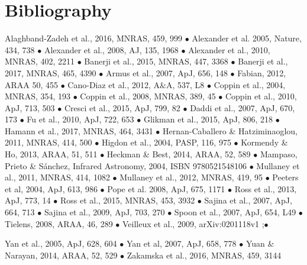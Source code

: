 \footnotesize
\section*{Bibliography}
\vspace{-8pt}
Alaghband-Zadeh et al., 2016, MNRAS, 459, 999 $\bullet$
Alexander et al. 2005, Nature, 434, 738  $\bullet$
Alexander et al., 2008, AJ, 135, 1968	 $\bullet$
Alexander et al., 2010, MNRAS, 402, 2211 $\bullet$
Banerji et al., 2015, MNRAS, 447, 3368 $\bullet$
Banerji et al., 2017, MNRAS, 465, 4390 $\bullet$
Armus et al., 2007, ApJ, 656, 148 $\bullet$
Fabian, 2012, ARAA 50, 455 $\bullet$ 
Cano-Diaz et al., 2012, A\&A, 537, L8 $\bullet$  
Coppin et al., 2004, MNRAS, 354, 193 $\bullet$
Coppin et al., 2008, MNRAS, 389, 45 $\bullet$
Coppin et al., 2010, ApJ, 713, 503 $\bullet$
Cresci et al., 2015, ApJ, 799, 82 $\bullet$
Daddi et al., 2007, ApJ, 670, 173	$\bullet$
Fu et al., 2010, ApJ, 722, 653 	$\bullet$
Glikman et al., 2015, ApJ, 806, 218 $\bullet$
Hamann et al., 2017, MNRAS, 464, 3431 $\bullet$
Hernan-Caballero \& Hatziminaoglou, 2011, MNRAS, 414, 500	$\bullet$
Higdon et al., 2004, PASP, 116, 975 $\bullet$
Kormendy \& Ho, 2013, ARAA, 51, 511 $\bullet$
Heckman \& Best, 2014, ARAA, 52, 589  $\bullet$
Mampaso, Prieto \& Sánchez, Infrared Astronomy, 2004, ISBN  9780521548106 $\bullet$
Mullaney et al., 2011, MNRAS, 414, 1082  $\bullet$
Mullaney et al., 2012, MNRAS, 419, 95 $\bullet$
Peeters et al, 2004, ApJ, 613, 986 $\bullet$
Pope et al. 2008, ApJ, 675, 1171 $\bullet$
Ross et al., 2013, ApJ, 773, 14 $\bullet$
Ross et al., 2015, MNRAS, 453, 3932 $\bullet$
Sajina et al., 2007, ApJ, 664, 713 $\bullet$
Sajina et al., 2009, ApJ, 703, 270 $\bullet$
Spoon et al., 2007, ApJ, 654, L49 $\bullet$
Tielens, 2008, ARAA, 46, 289  $\bullet$
Veilleux et al., 2009, arXiv:0201118v1 ;$\bullet$

Yan et al., 2005, ApJ, 628, 604 $\bullet$
Yan et al, 2007, ApJ, 658, 778 $\bullet$
Yuan \& Narayan, 2014, ARAA, 52, 529 $\bullet$
Zakamska et al., 2016, MNRAS, 459, 3144 

\normalsize
\medskip \medskip \medskip \medskip


